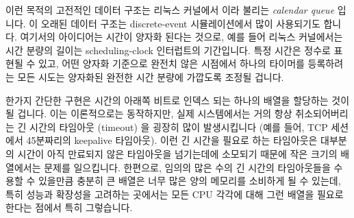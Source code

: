 이런 목적의 고전적인 데이터 구조는 리눅스 커널에서  이라 불리는
\emph{calendar queue} 입니다.
이 오래된 데이터 구조는 discrete-event 시뮬레이션에서 많이 사용되기도 합니다.
여기서의 아이디어는 시간이 양자화 된다는 것으로, 예를 들어 리눅스 커널에서는
시간 분량의 길이는 scheduling-clock 인터럽트의 기간입니다.
특정 시간은 정수로 표현될 수 있고, 어떤 양자화 기준으로 완전치 않은 시점에서
하나의 타이머를 등록하려는 모든 시도는 양자화된 완전한 시간 분량에 가깝도록
조정될 겁니다.

한가지 간단한 구현은 시간의 아래쪽 비트로 인덱스 되는 하나의 배열을 할당하는
것이 될 겁니다.
이는 이론적으로는 동작하지만, 실제 시스템에서는 거의 항상 취소되어버리는 긴
시간의 타임아웃 (timeout) 을 굉장히 많이 발생시킵니다 (예를 들어, TCP
세션에서 45분짜리의 keepalive 타임아웃).
이런 긴 시간을 필요로 하는 타임아웃은 대부분의 시간이 아직 만료되지 않은
타임아웃을 넘기는데에 소모되기 때문에 작은 크기의 배열에서는 문제를 일으킵니다.
한편으로, 임의의 많은 수의 긴 시간의 타임아웃들을 수용할 수 있을만큼 충분히 큰
배열은 너무 많은 양의 메모리를 소비하게 될 수 있는데, 특히 성능과 확장성을
고려하는 곳에서는 모든 CPU 각각에 대해 그런 배열을 필요로 한다는 점에서 특히
그렇습니다.

